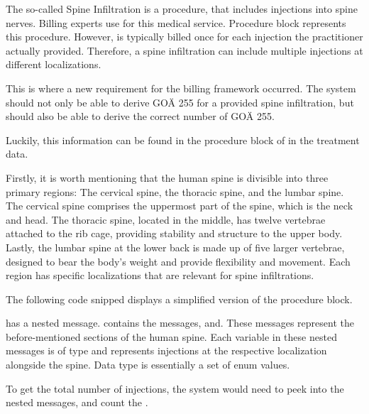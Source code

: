 The so-called Spine Infiltration is a procedure, that includes injections into spine nerves.
Billing experts use  for this medical service.
Procedure block  represents this procedure.
However,  is typically billed once for each injection the practitioner actually provided.
Therefore, a spine infiltration can include multiple injections at different localizations.

This is where a new requirement for the billing framework occurred.
The system should not only be able to derive GOÄ 255 for a provided spine infiltration, but should also be able to derive the correct number of GOÄ 255.

Luckily, this information can be found in the procedure block of in the treatment data.

Firstly, it is worth mentioning that the human spine is divisible into three primary regions:
The cervical spine, the thoracic spine, and the lumbar spine.
The cervical spine comprises the uppermost part of the spine, which is the neck and head.
The thoracic spine, located in the middle, has twelve vertebrae attached to the rib cage, providing stability and structure to the upper body.
Lastly, the lumbar spine at the lower back is made up of five larger vertebrae, designed to bear the body's weight and provide flexibility and movement.
Each region has specific localizations that are relevant for spine infiltrations.

The following code snipped displays a simplified version of the procedure block.



 has a nested message.
 contains the messages, and.
These messages represent the before-mentioned sections of the human spine.
Each variable in these nested messages is of type and represents injections at the respective localization alongside the spine.
Data type is essentially a set of enum values.

To get the total number of injections, the system would need to peek into the nested messages, and count the .

